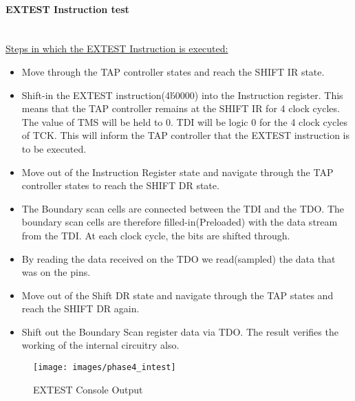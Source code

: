 \documentclass[a4paper,11pt]{article}
\begin{document}
\paragraph{EXTEST Instruction test}\mbox{}\\
\underline{Steps in which the EXTEST Instruction is executed:}
\begin{itemize}[noitemsep]
\item Move through the TAP controller states and reach the SHIFT IR state.
\item Shift-in the EXTEST instruction(4\'b0000) into the Instruction register. This means that the TAP controller remains at the SHIFT IR for 4 clock cycles. The value of TMS will be held to 0. TDI will be logic 0 for the 4 clock cycles of TCK. This will inform the TAP controller that the EXTEST instruction is to be executed.
\item Move out of the Instruction Register state and navigate through the TAP controller states to reach the SHIFT DR state.
\item The Boundary scan cells are connected between the TDI and the TDO. The boundary scan cells are therefore filled-in(Preloaded) with the data stream from the TDI. At each clock cycle, the bits are shifted through. 
\item By reading the data received on the TDO we read(sampled) the data that was on the pins.
\item Move out of the Shift DR state and navigate through the TAP states and reach the SHIFT DR again.
\item Shift out the Boundary Scan register data via TDO. The result verifies the working of the internal circuitry also.
\end{itemize}
\begin{figure}[ht]
\centering
\texttt{[image: images/phase4\_intest]}
\caption{EXTEST Console Output}
\end{figure}
\end{document}

